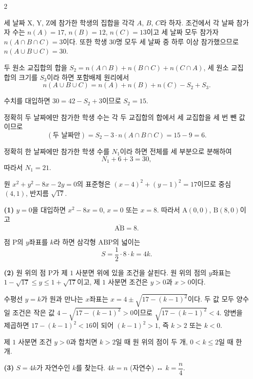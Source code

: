 \documentclass[10pt,fleqn]{article}
\renewcommand{\solpart}[1]{%
  \par\addvspace{10pt}\noindent
  {\sffamily\bfseries\color{black}(#1)}\hspace{3mm}\ignorespaces%
}
\begin{document}
\begin{multicols}{2}
\raggedcolumns


세 날짜 $\mathrm{X}$, $\mathrm{Y}$, $\mathrm{Z}$에 참가한 학생의 집합을 각각 $A$, $B$, $C$라 하자. 조건에서 각 날짜 참가자 수는 $n(A) = 17$, $n(B) = 12$, $n(C) = 13$이고 세 날짜 모두 참가자 $n(A \cap B \cap C) = 3$이다. 또한 학생 $30$명 모두 세 날짜 중 하루 이상 참가했으므로 $n(A \cup B \cup C) = 30$.

두 원소 교집합의 합을 $S_{2} = n(A \cap B) + n(B \cap C) + n(C \cap A)$, 세 원소 교집합의 크기를 $S_{3}$이라 하면 포함배제 원리에서
\[ n(A \cup B \cup C) = n(A)+n(B)+n(C) - S_{2} + S_{3}. \]

수치를 대입하면 $30 = 42 - S_{2} + 3$이므로 $S_{2} = 15$.

정확히 두 날짜에만 참가한 학생 수는 각 두 교집합의 합에서 세 교집합을 세 번 뺀 값이므로
\[ (\text{두 날짜만}) = S_{2} - 3\cdot n(A \cap B \cap C) = 15 - 9 = 6. \]

정확히 한 날짜에만 참가한 학생 수를 $N_{1}$이라 하면 전체를 세 부분으로 분해하여
\[ N_{1} + 6 + 3 = 30, \]
따라서 $N_{1} = 21$.


원 $x^{2} + y^{2} - 8x - 2y = 0$의 표준형은 $(x - 4)^{2} + (y - 1)^{2} = 17$이므로 중심 $(4, 1)$, 반지름 $\sqrt{17}$.

\solpart{1} $y = 0$을 대입하면 $x^{2} - 8x = 0$, $x = 0$ 또는 $x = 8$. 따라서 $\mathrm{A}(0, 0)$, $\mathrm{B}(8, 0)$이고
\[ \overline{\mathrm{AB}} = 8. \]

점 $\mathrm{P}$의 $y$좌표를 $k$라 하면 삼각형 $\mathrm{ABP}$의 넓이는
\[ S = \dfrac{1}{2} \cdot 8 \cdot k = 4k. \]

\solpart{2} 원 위의 점 $\mathrm{P}$가 제 $1$ 사분면 위에 있을 조건을 살핀다. 원 위의 점의 $y$좌표는 $1 - \sqrt{17} \le y \le 1 + \sqrt{17}$이고, 제 $1$ 사분면 조건은 $y > 0$과 $x > 0$이다.

수평선 $y = k$가 원과 만나는 $x$좌표는 $x = 4 \pm \sqrt{17 - (k-1)^{2}}$이다. 두 값 모두 양수일 조건은 작은 값 $4 - \sqrt{17 - (k-1)^{2}} > 0$이므로 $\sqrt{17 - (k-1)^{2}} < 4$. 양변을 제곱하면 $17 - (k-1)^{2} < 16$이 되어 $(k-1)^{2} > 1$, 즉 $k > 2$ 또는 $k < 0$.

제 $1$ 사분면 조건 $y > 0$과 합치면 $k > 2$일 때 원 위의 점이 두 개, $0 < k \le 2$일 때 한 개.

\solpart{3} $S = 4k$가 자연수인 $k$를 찾는다. $4k = n$ (자연수) ↔ $k = \dfrac{n}{4}$.


\end{multicols}
\end{document}
